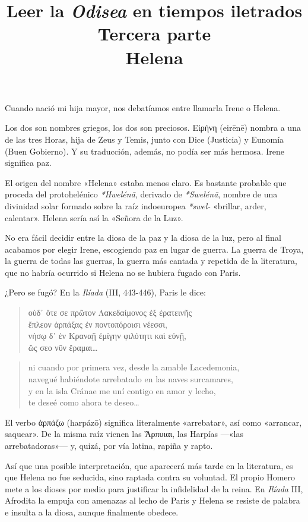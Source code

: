 \documentclass[11pt,a4paper]{article}
\title{Leer la \emph{Odisea} en tiempos iletrados \\ Tercera parte \\ Helena}
\author{}
\date{}
\newcommand{\gr}[1]{\foreignlanguage{greek}{#1}}
\begin{document}
\maketitle

Cuando nació mi hija mayor, nos debatíamos entre llamarla Irene o Helena.

Los dos son nombres griegos, los dos son preciosos. \gr{Εἰρήνη} (eirēnē) nombra a una de las tres Horas, hija de Zeus y Temis, junto con Dice (Justicia) y Eunomía (Buen Gobierno). Y su traducción, además, no podía ser más hermosa. Irene significa paz.

El origen del nombre «Helena» estaba menos claro. Es bastante probable que proceda del protohelénico \emph{*Hwelénā}, derivado de \emph{*Swelénā}, nombre de una divinidad solar formado sobre la raíz indoeuropea \emph{*swel-} «brillar, arder, calentar». Helena sería así la «Señora de la Luz».

No era fácil decidir entre la diosa de la paz y la diosa de la luz, pero al final acabamos por elegir Irene, escogiendo paz en lugar de guerra. La guerra de Troya, la guerra de todas las guerras, la guerra más cantada y repetida de la literatura, que no habría ocurrido si Helena no se hubiera fugado con Paris.

¿Pero se fugó? En la \emph{Ilíada} (III, 443-446), Paris le dice:

\begin{verse}
\foreignlanguage{greek}{οὐδ᾽ ὅτε σε πρῶτον Λακεδαίμονος ἐξ ἐρατεινῆς\\
ἔπλεον ἁρπάξας ἐν ποντοπόροισι νέεσσι,\\
νήσῳ δ᾽ ἐν Κραναῇ ἐμίγην φιλότητι καὶ εὐνῇ,\\
ὥς σεο νῦν ἔραμαι…}
\end{verse}

\begin{verse}
ni cuando por primera vez, desde la amable Lacedemonia,\\
navegué habiéndote arrebatado en las naves surcamares,\\
y en la isla Cránae me uní contigo en amor y lecho,\\
te deseé como ahora te deseo…
\end{verse}

El verbo \gr{ἁρπάζω} (harpázō) significa literalmente «arrebatar», así como «arrancar, saquear». De la misma raíz vienen las \gr{Ἅρπυιαι}, las Harpías ---«las arrebatadoras»--- y, quizá, por vía latina, rapiña y rapto.

Así que una posible interpretación, que aparecerá más tarde en la literatura, es que Helena no fue seducida, sino raptada contra su voluntad. El propio Homero mete a los dioses por medio para justificar la infidelidad de la reina. En \emph{Ilíada} III, Afrodita la empuja con amenazas al lecho de Paris y Helena se resiste de palabra e insulta a la diosa, aunque finalmente obedece.
\end{document}
